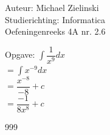\documentclass[a4paper]{article}
\begin{document}
\noindent \large Auteur: Michael Zielinski \\
\noindent \large Studierichting: Informatica \\
\noindent \large Oefeningenreeks 4A nr. 2.6 \\

\medskip

\normalsize

Opgave:  
$\displaystyle\int \dfrac{1}{x^9}dx$ \\

$= \displaystyle\int x^{-9}dx$ \\

$= \dfrac{x^{-8}}{-8} + c$ \\

$= \dfrac{-1}{8x^8} + c$

\begin{thebibliography}{999}
\end{thebibliography}
\end{document}
